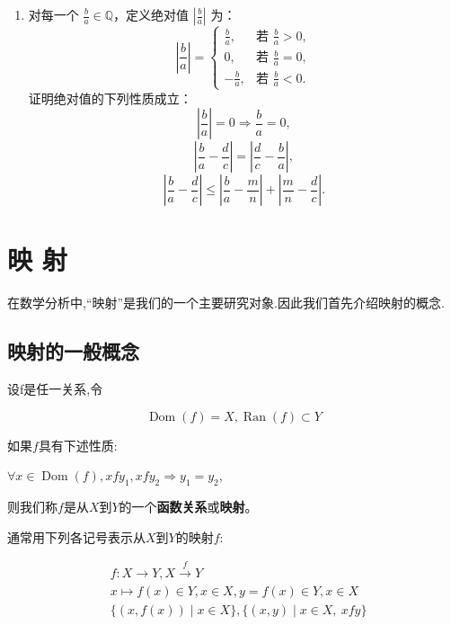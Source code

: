 \begin{exercise}
\begin{enumerate}[label=\arabic*)]
		\item 对每一个 $\frac{b}{a} \in \mathbb{Q}$，定义绝对值 $\left| \frac{b}{a} \right|$ 为：
		\[
		\left| \frac{b}{a} \right| = 
		\begin{cases}
			\frac{b}{a}, & \text{若 } \frac{b}{a} > 0, \\
			0, & \text{若 } \frac{b}{a} = 0, \\
			-\frac{b}{a}, & \text{若 } \frac{b}{a} < 0.
		\end{cases}
		\]
		证明绝对值的下列性质成立：
		\[
		\left| \frac{b}{a} \right| = 0 \Longrightarrow \frac{b}{a} = 0,
		\]
		\[
		\left| \frac{b}{a} - \frac{d}{c} \right| = \left| \frac{d}{c} - \frac{b}{a} \right|,
		\]
		\[
		\left| \frac{b}{a} - \frac{d}{c} \right| \leqslant \left| \frac{b}{a} - \frac{m}{n} \right| + \left| \frac{m}{n} - \frac{d}{c} \right|.
		\]
	\end{enumerate}
\end{exercise}

\section{映 射}

在数学分析中,“映射”是我们的一个主要研究对象.因此我们首先介绍映射的概念.

\subsection{映射的一般概念}
	\label{sec:1-3-1}

\begin{mydef*}{}

设f是任一关系,令

\[\operatorname{Dom}(f) = X , \operatorname{Ran}(f) \subset Y \]

如果$f$具有下述性质:

\(\forall x \in \operatorname{Dom}(f), xfy_1, xfy_2 \Longrightarrow y_1 = y_2,\)

则我们称$f$是从$X$到$Y$的一个\textbf{函数关系}或\textbf{映射}。


\end{mydef*}

通常用下列各记号表示从$X$到$Y$的映射$f$:

\begin{align*}
	& f: X \longrightarrow Y,  X \xrightarrow{f} Y  \\
	& x \longmapsto f(x) \in Y, x \in X, y = f(x) \in Y, x\in X \\
	& \{(x, f(x)) \mid x \in X\} , \{(x, y) \mid x \in X,\ x f y\}
\end{align*}

